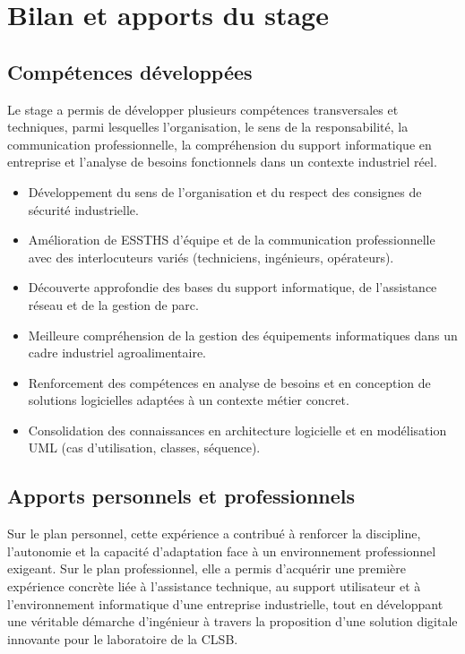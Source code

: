 \documentclass[12pt,a4paper,oneside]{report}
\begin{document}
\chapter{Bilan et apports du stage}

\section{Compétences développées}
Le stage a permis de développer plusieurs compétences transversales et techniques, parmi lesquelles l'organisation, le sens de la responsabilité, la communication professionnelle, la compréhension du support informatique en entreprise et l'analyse de besoins fonctionnels dans un contexte industriel réel.

\begin{itemize}[leftmargin=1.2cm]
\item Développement du sens de l'organisation et du respect des consignes de sécurité industrielle.
\item Amélioration de ESSTHS d'équipe et de la communication professionnelle avec des interlocuteurs variés (techniciens, ingénieurs, opérateurs).
\item Découverte approfondie des bases du support informatique, de l'assistance réseau et de la gestion de parc.
\item Meilleure compréhension de la gestion des équipements informatiques dans un cadre industriel agroalimentaire.
\item Renforcement des compétences en analyse de besoins et en conception de solutions logicielles adaptées à un contexte métier concret.
\item Consolidation des connaissances en architecture logicielle et en modélisation UML (cas d'utilisation, classes, séquence).
\end{itemize}

\section{Apports personnels et professionnels}
Sur le plan personnel, cette expérience a contribué à renforcer la discipline, l'autonomie et la capacité d'adaptation face à un environnement professionnel exigeant. Sur le plan professionnel, elle a permis d'acquérir une première expérience concrète liée à l'assistance technique, au support utilisateur et à l'environnement informatique d'une entreprise industrielle, tout en développant une véritable démarche d'ingénieur à travers la proposition d'une solution digitale innovante pour le laboratoire de la CLSB.
\end{document}
